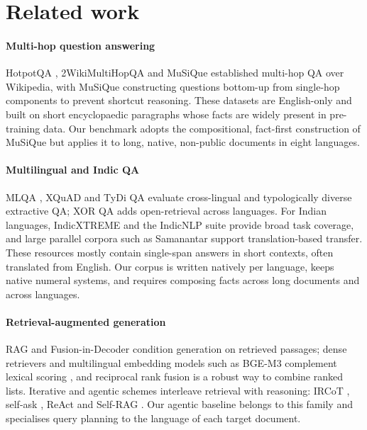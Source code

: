 \documentclass[preprint,12pt]{elsarticle}
\begin{document}
\section{Related work}
\label{sec:related}

\paragraph{Multi-hop question answering}
HotpotQA \cite{yang2018hotpotqa}, 2WikiMultiHopQA \cite{ho2020twowiki} and MuSiQue \cite{trivedi2022musique} established multi-hop QA over Wikipedia, with MuSiQue constructing questions bottom-up from single-hop components to prevent shortcut reasoning. These datasets are English-only and built on short encyclopaedic paragraphs whose facts are widely present in pre-training data. Our benchmark adopts the compositional, fact-first construction of MuSiQue but applies it to long, native, non-public documents in eight languages.

\paragraph{Multilingual and Indic QA}
MLQA \cite{lewis2020mlqa}, XQuAD \cite{artetxe2020xquad} and TyDi QA \cite{clark2020tydiqa} evaluate cross-lingual and typologically diverse extractive QA; XOR QA \cite{asai2021xorqa} adds open-retrieval across languages. For Indian languages, IndicXTREME \cite{doddapaneni2023indicxtreme} and the IndicNLP suite \cite{kakwani2020indicnlpsuite} provide broad task coverage, and large parallel corpora such as Samanantar \cite{ramesh2022samanantar} support translation-based transfer. These resources mostly contain single-span answers in short contexts, often translated from English. Our corpus is written natively per language, keeps native numeral systems, and requires composing facts across long documents and across languages.

\paragraph{Retrieval-augmented generation}
RAG \cite{lewis2020rag} and Fusion-in-Decoder \cite{izacard2021fid} condition generation on retrieved passages; dense retrievers \cite{karpukhin2020dpr,khattab2020colbert} and multilingual embedding models such as BGE-M3 \cite{chen2024bgem3} complement lexical scoring \cite{robertson2009bm25}, and reciprocal rank fusion \cite{cormack2009rrf} is a robust way to combine ranked lists. Iterative and agentic schemes interleave retrieval with reasoning: IRCoT \cite{trivedi2023ircot}, self-ask \cite{press2023selfask}, ReAct \cite{yao2023react} and Self-RAG \cite{asai2024selfrag}. Our agentic baseline belongs to this family and specialises query planning to the language of each target document.
\end{document}
